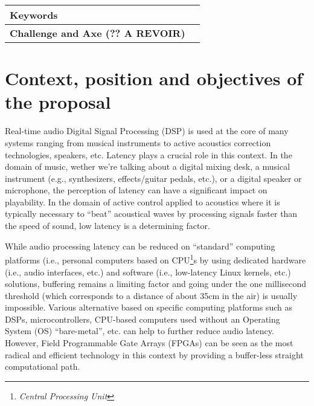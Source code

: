 \documentclass[a4paper,10pt]{article}
\author{Coordinateur: Romain Michon\\
\small GRAME-CNCM, Lyon.
}
\title{\vspace{-\baselineskip}\mytitle}
\date{Domaine transversaux\\
Axe 8.6 - Révolution numérique : rapports au savoir et à la culture}
\begin{document}
\maketitle
\thispagestyle{fancy}



\begin{tabular}{p{2.3cm} p{12cm}}
  \hline
  \textbf{Keywords} &   \\\hline
  \textbf{Challenge and Axe (?? A REVOIR)} & 
  \\\hline
\end{tabular}


\section{Context, position and objectives of the proposal}

Real-time audio Digital Signal Processing (DSP) is used at the core of many systems ranging from musical instruments to active acoustics correction technologies, speakers, etc. Latency plays a crucial role in this context.  In the domain of music, wether we're talking about a digital mixing desk, a musical instrument (e.g., synthesizers, effects/guitar pedals, etc.), or a digital speaker or microphone, the perception of latency can have a significant impact on playability. In the domain of active control applied to acoustics where it is typically necessary to ``beat'' acoustical waves by processing signals faster than the speed of sound, low latency is a determining factor.   

While audio processing latency can be reduced on ``standard'' computing platforms (i.e., personal computers based on CPU\footnote{\textit{Central Processing Unit}}s by using dedicated hardware (i.e., audio interfaces, etc.) and software (i.e., low-latency Linux kernels, etc.) solutions, buffering remains a limiting factor and going under the one millisecond threshold (which corresponds to a distance of about 35cm in the air) is usually impossible. Various alternative based on specific computing platforms such as DSPs, microcontrollers, CPU-based computers used without an Operating System (OS) ``bare-metal'', etc. can help to further reduce audio latency. However, Field Programmable Gate Arrays (FPGAs) can be seen as the most radical and efficient technology in this context by providing a buffer-less straight computational path.
\end{document}
